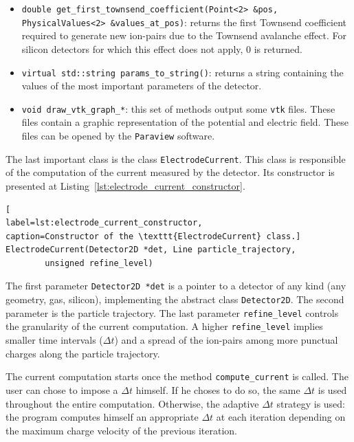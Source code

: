 \documentclass[11pt]{article}
\begin{document}
\begin{itemize}
			\item \lstinline{double get_first_townsend_coefficient(Point<2> &pos, PhysicalValues<2> &values_at_pos)}:
			returns the first Townsend coefficient required to generate new ion-pairs due
			to the Townsend avalanche effect. For silicon detectors for which this effect
			does not apply, 0 is returned.

			\item \lstinline{virtual std::string params_to_string()}: returns a string
			containing the values of the most important parameters of the detector.

			\item \lstinline{void draw_vtk_graph_*}: this set of methods output some \texttt{vtk}
			files. These files contain a graphic representation of the potential and
			electric field. These files can be opened by the \texttt{Paraview} software.
		\end{itemize}

		The last important class is the class \texttt{ElectrodeCurrent}. This class
		is responsible of the computation of the current measured by the detector. Its
		constructor is presented at Listing~\ref{lst:electrode_current_constructor}.
		\newline

		\begin{lstlisting}[
label=lst:electrode_current_constructor,
caption=Constructor of the \texttt{ElectrodeCurrent} class.]
ElectrodeCurrent(Detector2D *det, Line particle_trajectory,
		unsigned refine_level)
		\end{lstlisting}

		The first parameter \texttt{Detector2D *det} is a pointer to a detector of
		any kind (any geometry, gas, silicon), implementing the abstract class \texttt{Detector2D}.
		The second parameter is the particle trajectory. The last parameter \texttt{refine\_level}
		controls the granularity of the current computation. A higher \texttt{refine\_level}
		implies smaller time intervals ($\Delta t$) and a spread of the ion-pairs among
		more punctual charges along the particle trajectory.

		The current computation starts once the method \texttt{compute\_current} is called.
		The user can chose to impose a $\Delta t$ himself. If he choses to do so, the
		same $\Delta t$ is used throughout the entire computation. Otherwise,
		the adaptive $\Delta t$ strategy is used: the program computes himself an
		appropriate $\Delta t$ at each iteration depending on the maximum charge velocity
		of the previous iteration.


\newpage




\end{document}
